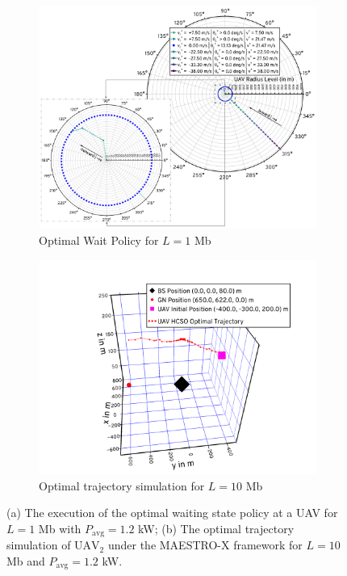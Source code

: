 \documentclass[12pt, draftcls, onecolumn]{IEEEtran}
\theoremstyle{plain}
\theoremstyle{definition}
\theoremstyle{remark}
\begin{document}
\begin{figure} [t]
      \begin{subfigure}{0.5\linewidth}
	     \centering
         \includegraphics[width=0.9\linewidth]{figs/Optimal_Waiting_Policy_1Mb.png}
         \caption{Optimal Wait Policy for $L{=}1$ Mb}
		 \label{F6}
	 \end{subfigure}
     \begin{subfigure}{0.516\linewidth}
         \centering
  		 \includegraphics[width=0.9\linewidth]{figs/Optimal_UAV_Trajectory.png}
		 \caption{Optimal trajectory simulation for $L{=}10$ Mb}
         \label{F7}
     \end{subfigure}
     \vspace{-2mm}
     \caption{(a) The execution of the optimal waiting state policy at a UAV for $L{=}1$ Mb with $P_{\mathrm{avg}}{=}1.2$ kW; (b) The optimal trajectory simulation of $\text{UAV}_{2}$ under the MAESTRO-X framework for $L{=}10$ Mb and $P_{\text{avg}}{=}1.2$ kW.}
\end{figure}
\end{document}

